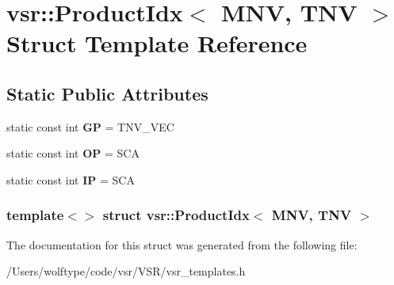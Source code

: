 \hypertarget{structvsr_1_1_product_idx_3_01_m_n_v_00_01_t_n_v_01_4}{\section{vsr\-:\-:Product\-Idx$<$ M\-N\-V, T\-N\-V $>$ Struct Template Reference}
\label{structvsr_1_1_product_idx_3_01_m_n_v_00_01_t_n_v_01_4}
}
\subsection*{Static Public Attributes}
\begin{DoxyCompactItemize}
\item 
\hypertarget{structvsr_1_1_product_idx_3_01_m_n_v_00_01_t_n_v_01_4_ad3a3b5b0f46efb7e37b3553cfb6d69f6}{static const int {\bfseries G\-P} = T\-N\-V\-\_\-\-V\-E\-C}\label{structvsr_1_1_product_idx_3_01_m_n_v_00_01_t_n_v_01_4_ad3a3b5b0f46efb7e37b3553cfb6d69f6}

\item 
\hypertarget{structvsr_1_1_product_idx_3_01_m_n_v_00_01_t_n_v_01_4_aab03e8c933b32ad614f4c8330b782ec2}{static const int {\bfseries O\-P} = S\-C\-A}\label{structvsr_1_1_product_idx_3_01_m_n_v_00_01_t_n_v_01_4_aab03e8c933b32ad614f4c8330b782ec2}

\item 
\hypertarget{structvsr_1_1_product_idx_3_01_m_n_v_00_01_t_n_v_01_4_a91c6f2be1839eb1dbb58b8f60658cbe9}{static const int {\bfseries I\-P} = S\-C\-A}\label{structvsr_1_1_product_idx_3_01_m_n_v_00_01_t_n_v_01_4_a91c6f2be1839eb1dbb58b8f60658cbe9}

\end{DoxyCompactItemize}
\subsubsection*{template$<$$>$ struct vsr\-::\-Product\-Idx$<$ M\-N\-V, T\-N\-V $>$}



The documentation for this struct was generated from the following file\-:\begin{DoxyCompactItemize}
\item 
/\-Users/wolftype/code/vsr/\-V\-S\-R/vsr\-\_\-templates.\-h\end{DoxyCompactItemize}
